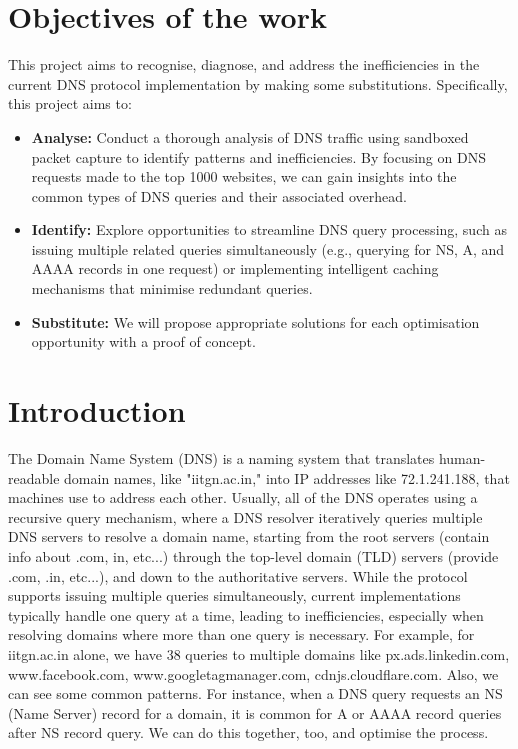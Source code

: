 \documentclass{article}
\begin{document}
\section{Objectives of the work}
This project aims to recognise, diagnose, and address the inefficiencies in the current DNS protocol implementation by making some substitutions. Specifically, this project aims to:
\begin{itemize}
    \item \textbf{Analyse:} Conduct a thorough analysis of DNS traffic using sandboxed packet capture to identify patterns and inefficiencies. By focusing on DNS requests made to the top 1000 websites, we can gain insights into the common types of DNS queries and their associated overhead.
    \item \textbf{Identify:} Explore opportunities to streamline DNS query processing, such as issuing multiple related queries simultaneously (e.g., querying for NS, A, and AAAA records in one request) or implementing intelligent caching mechanisms that minimise redundant queries.
    \item \textbf{Substitute:} We will propose appropriate solutions for each optimisation opportunity with a proof of concept.
\end{itemize}

\section{Introduction}
The Domain Name System (DNS) is a naming system that translates human-readable domain names, like "iitgn.ac.in," into IP addresses like 72.1.241.188, that machines use to address each other. Usually, all of the DNS operates using a recursive query mechanism, where a DNS resolver iteratively queries multiple DNS servers to resolve a domain name, starting from the root servers (contain info about .com, in, etc...) through the top-level domain (TLD) servers (provide .com, .in,  etc...), and down to the authoritative servers. While the protocol supports issuing multiple queries simultaneously, current implementations typically handle one query at a time, leading to inefficiencies, especially when resolving domains where more than one query is necessary. For example, for iitgn.ac.in alone, we have 38 queries to multiple domains like px.ads.linkedin.com, www.facebook.com, www.googletagmanager.com, cdnjs.cloudflare.com. Also, we can see some common patterns. For instance, when a DNS query requests an NS (Name Server) record for a domain, it is common for  A or AAAA record queries after NS record query. We can do this together, too, and optimise the process.
\end{document}
